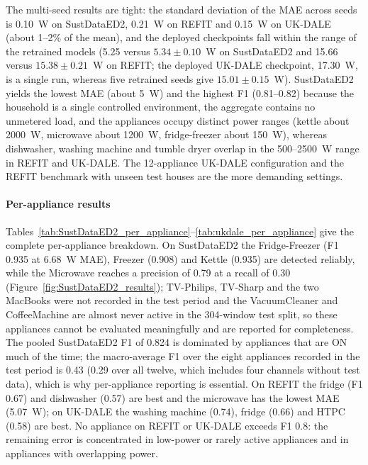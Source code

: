 \documentclass[fleqn,10pt]{wlscirep}
\begin{document}
The multi-seed results are tight: the standard deviation of the MAE across seeds is 0.10~W on SustDataED2, 0.21~W on REFIT and 0.15~W on UK-DALE (about 1--2\% of the mean), and the deployed checkpoints fall within the range of the retrained models (5.25 versus $5.34\pm0.10$~W on SustDataED2 and 15.66 versus $15.38\pm0.21$~W on REFIT; the deployed UK-DALE checkpoint, 17.30~W, is a single run, whereas five retrained seeds give $15.01\pm0.15$~W). SustDataED2 yields the lowest MAE (about 5~W) and the highest F1 (0.81--0.82) because the household is a single controlled environment, the aggregate contains no unmetered load, and the appliances occupy distinct power ranges (kettle about 2000~W, microwave about 1200~W, fridge-freezer about 150~W), whereas dishwasher, washing machine and tumble dryer overlap in the 500--2500~W range in REFIT and UK-DALE. The 12-appliance UK-DALE configuration and the REFIT benchmark with unseen test houses are the more demanding settings.

\paragraph{Per-appliance results} Tables~\ref{tab:SustDataED2_per_appliance}--\ref{tab:ukdale_per_appliance} give the complete per-appliance breakdown. On SustDataED2 the Fridge-Freezer (F1 0.935 at 6.68~W MAE), Freezer (0.908) and Kettle (0.935) are detected reliably, while the Microwave reaches a precision of 0.79 at a recall of 0.30 (Figure~\ref{fig:SustDataED2_results}); TV-Philips, TV-Sharp and the two MacBooks were not recorded in the test period and the VacuumCleaner and CoffeeMachine are almost never active in the 304-window test split, so these appliances cannot be evaluated meaningfully and are reported for completeness. The pooled SustDataED2 F1 of 0.824 is dominated by appliances that are ON much of the time; the macro-average F1 over the eight appliances recorded in the test period is 0.43 (0.29 over all twelve, which includes four channels without test data), which is why per-appliance reporting is essential. On REFIT the fridge (F1 0.67) and dishwasher (0.57) are best and the microwave has the lowest MAE (5.07~W); on UK-DALE the washing machine (0.74), fridge (0.66) and HTPC (0.58) are best. No appliance on REFIT or UK-DALE exceeds F1 0.8: the remaining error is concentrated in low-power or rarely active appliances and in appliances with overlapping power.
\end{document}

